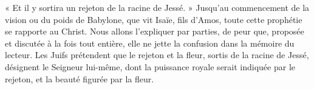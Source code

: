« Et il y sortira un rejeton de la racine de Jessé. » Jusqu’au commencement de la vision ou du poids de Babylone, que vit Isaïe, fils d’Amos, toute cette prophétie se rapporte au Christ. Nous allons l’expliquer par parties, de peur que, proposée et discutée à la fois tout entière, elle ne jette la confusion dans la mémoire du lecteur. Les Juifs prétendent que le rejeton et la fleur, sortis de la racine de Jessé, désignent le Seigneur lui-même, dont la puissance royale serait indiquée par le rejeton, et la beauté figurée par la fleur.